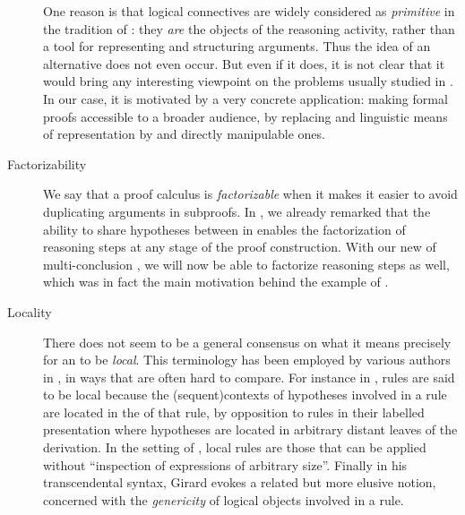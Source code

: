 \begin{scope}
\begin{scope}
\begin{description}
    One reason is that logical connectives are widely considered as
    \emph{primitive} in the tradition of : they
    \emph{are} the objects of the reasoning activity, rather than a tool for
    representing and structuring arguments. Thus the idea of an alternative does
    not even occur. But even if it does, it is not clear that it would bring any
    interesting viewpoint on the problems usually studied in .
    In our case, it is motivated by a very concrete application: making formal
    proofs accessible to a broader audience, by replacing  and
    linguistic means of representation by  and directly manipulable
    ones.
  \item[Factorizability]
    We say that a proof calculus is \emph{factorizable} when it makes it easier
    to avoid duplicating arguments in subproofs. In , we
    already remarked that the ability to share hypotheses between 
    in  enables the factorization of \emph{} reasoning steps
    at any stage of the proof construction. With our new  of multi-conclusion , we will now be able to
    factorize \emph{} reasoning steps as well, which was in fact
    the main motivation behind the example of .
  \item[Locality]
    There does not seem to be a general consensus on what it means precisely for
    an  to be \emph{local}. This terminology has been
    employed by various authors in , in ways that are often
    hard to compare. For instance in , rules are
    said to be local because the \kl(sequent){contexts} of hypotheses involved in a rule are
    located in the  of that rule, by opposition to  rules in their labelled presentation where hypotheses are located
    in arbitrary distant leaves of the derivation. In the setting of , local rules are those that can be applied without ``inspection
    of expressions of arbitrary size''. Finally in his transcendental syntax, Girard evokes
    a related but more elusive notion, concerned with the \emph{genericity} of
    logical objects involved in a rule.
    

\end{description}
\end{scope}
\end{scope}
